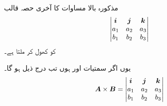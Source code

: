 مذکورہ بالا مساوات کا آخری حصہ قالب
\begin{align*}
\begin{vmatrix}
{\boldsymbol{i}}&{\boldsymbol{j}}&{\boldsymbol{k}}\\
a_1&a_2&a_3\\
b_1&b_2&b_3
\end{vmatrix}
\end{align*}  
 کو کھول کر ملتا ہے۔

یوں اگر سمتیات  اور  ہوں تب درج ذیل ہو گا۔
\begin{align}
{\ensuremath{{\boldsymbol{A}}}}\times{\ensuremath{{\boldsymbol{B}}}}=
\begin{vmatrix}
{\boldsymbol{i}}&{\boldsymbol{j}}&{\boldsymbol{k}}\\
a_1&a_2&a_3\\
b_1&b_2&b_3
\end{vmatrix}
\end{align}

